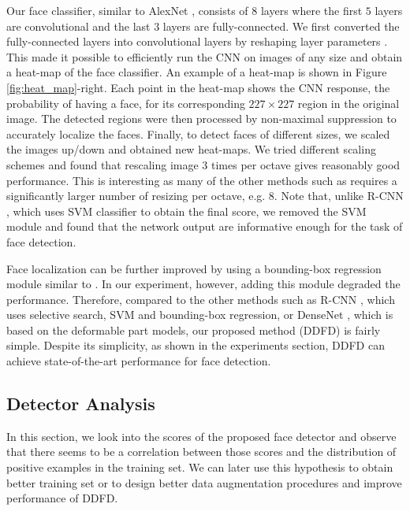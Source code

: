 \documentclass{sig-alternate-2013}
\begin{document}
Our face classifier, similar to AlexNet \cite{alex-net}, consists of $8$ layers where the first $5$ layers are convolutional and the last $3$ layers are fully-connected. We first converted the fully-connected layers into convolutional layers by reshaping layer parameters \cite{densenet}. This made it possible to efficiently run the CNN on images of any size and obtain a heat-map of the face classifier. An example of a heat-map is shown in Figure \ref{fig:heat_map}-right. Each point in the heat-map shows the CNN response, the probability of having a face, for its corresponding $227 \times 227$ region in the original image. The detected regions were then processed by non-maximal suppression to accurately localize the faces. Finally, to detect faces of different sizes, we scaled the images up/down and obtained new heat-maps. We tried different scaling schemes and found that rescaling image $3$ times per octave gives reasonably good performance. This is interesting as many of the other methods such as \cite{head_hunter, pyramid_piotr} requires a significantly larger number of resizing per octave, e.g. $8$. Note that, unlike R-CNN \cite{rcnn}, which uses SVM classifier to obtain the final score, we removed the SVM module and found that the network output are informative enough for the task of face detection.

 Face localization can be further improved by using a bounding-box regression module similar to \cite{overfeat, rcnn}. In our experiment, however, adding this module degraded the performance. Therefore, compared to the other methods such as R-CNN \cite{rcnn}, which uses selective search, SVM and bounding-box regression, or DenseNet \cite{dense_net_dpm}, which is based on the deformable part models, our proposed method (DDFD) is fairly simple. Despite its simplicity, as shown in the experiments section, DDFD can achieve state-of-the-art performance for face detection.

\subsection{Detector Analysis}
        
In this section, we look into the scores of the proposed face detector and observe that
there seems to be a correlation between those scores and the distribution of positive examples in the training set. We can later use this hypothesis to obtain better training set or to design better data augmentation procedures and improve performance of DDFD.
\end{document}
